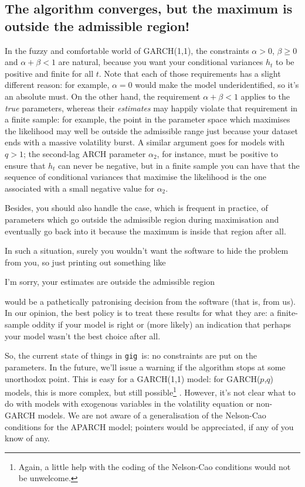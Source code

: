 \documentclass[a4paper,11pt]{article}
\newcommand{\gig}{\texttt{gig}}
\begin{document}
\subsection{The algorithm converges, but the maximum is outside the
  admissible region!}

In the fuzzy and comfortable world of GARCH(1,1), the constraints
$\alpha > 0$, $\beta \ge 0$ and $\alpha + \beta < 1$ are natural,
because you want your conditional variances $h_t$ to be positive and
finite for all $t$. Note that each of those requirements has a slight
different reason: for example, $\alpha = 0$ would make the model
underidentified, so it's an absolute must. On the other hand, the
requirement $\alpha + \beta < 1$ applies to the \emph{true}
parameters, whereas their \emph{estimates} may happily violate that
requirement in a finite sample: for example, the point in the
parameter space which maximises the likelihood may well be outside the
admissible range just because your dataset ends with a massive
volatility burst. A similar argument goes for models with $q>1$; the
second-lag ARCH parameter $\alpha_2$, for instance, must be positive to
ensure that $h_t$ can never be negative, but in a finite sample you
can have that the sequence of conditional variances that maximise the
likelihood is the one associated with a small negative value for
$\alpha_2$.

Besides, you should also handle the case, which is frequent in
practice, of parameters which go outside the admissible region during
maximisation and eventually go back into it because the maximum is
inside that region after all.

In such a situation, surely you wouldn't want the software to hide the
problem from you, so just printing out something like 
\begin{code}
  I'm sorry, your estimates are outside the admissible region
\end{code}
would be a pathetically patronising decision from the software (that
is, from us). In our opinion, the best policy is to treat these
results for what they are: a finite-sample oddity if your model is
right or (more likely) an indication that perhaps your model wasn't
the best choice after all.

So, the current state of things in \gig\ is: no constraints are put on
the parameters. In the future, we'll issue a warning if the algorithm
stops at some unorthodox point. This is easy for a GARCH(1,1) model:
for GARCH($p$,$q$) models, this is more complex, but still
possible\footnote{Again, a little help with the coding of the
  Nelson-Cao conditions would not be unwelcome.}
\citep{NelCao92}. However, it's not clear what to do with models with
exogenous variables in the volatility equation or non-GARCH models. We
are not aware of a generalisation of the Nelson-Cao conditions for the
APARCH model; pointers would be appreciated, if any of you know of
any.
\end{document}
